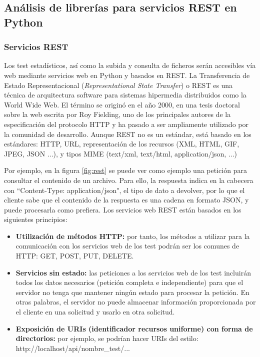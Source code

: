 \subsection{Análisis de librerías para servicios REST en Python} \label{bottle}

\subsubsection{\textbf{Servicios REST}}
Los test estadísticos, así como la subida y consulta de ficheros serán accesibles vía web mediante servicios web en Python y basados en REST. La Transferencia de Estado Representacional (\textit{Representational State Transfer}) o REST es una técnica de arquitectura software para sistemas hipermedia distribuidos como la World Wide Web. El término se originó en el año 2000, en una tesis doctoral sobre la web escrita por Roy Fielding, uno de los principales autores de la especificación del protocolo HTTP y ha pasado a ser ampliamente utilizado por la comunidad de desarrollo. Aunque REST no es un estándar, está basado en los estándares: HTTP, URL, representación de los recursos (XML, HTML, GIF, JPEG, JSON ...), y tipos MIME (text/xml, text/html, application/json, ...)

Por ejemplo, en la figura \ref{fig:rest} se puede ver como ejemplo una petición para consultar el contenido de un archivo. Para ello, la respuesta indica en la cabecera con ``Content-Type: application/json", el tipo de dato a devolver, por lo que el cliente sabe que el contenido de la respuesta es una cadena en formato JSON, y puede procesarla como prefiera. Los servicios web REST están basados en los siguientes principios:

\begin{itemize}
\item \textbf{Utilización de métodos HTTP:} por tanto, los métodos a utilizar para la comunicación con los servicios web de los test podrán ser los comunes de HTTP: GET, POST, PUT, DELETE.
\item \textbf{Servicios sin estado:} las peticiones a los servicios web de los test incluirán todos los datos necesarios (petición completa e independiente) para que el servidor no tenga que mantener ningún estado para procesar la petición. En otras palabras, el servidor no puede almacenar información proporcionada por el cliente en una solicitud y usarlo en otra solicitud.
\item \textbf{Exposición de URIs (identificador recursos uniforme) con forma de directorios:} por ejemplo, se podrían hacer URIs del estilo: http://localhost/api/nombre\_test/...
\end{itemize}


